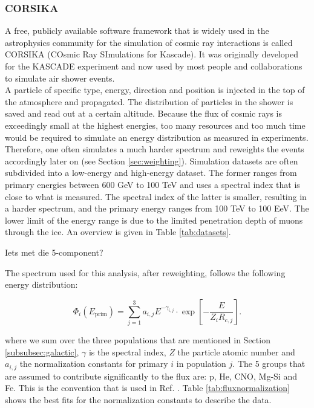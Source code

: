 \subsubsection{CORSIKA}
A free, publicly available software framework that is widely used in the astrophysics community for the simulation of cosmic ray interactions is called CORSIKA (COsmic Ray SImulations for Kascade). It was originally developed for the KASCADE experiment and now used by most people and collaborations to simulate air shower events.\\

\noindent A particle of specific type, energy, direction and position is injected in the top of the atmosphere and propagated. The distribution of particles in the shower is saved and read out at a certain altitude. Because the flux of cosmic rays is exceedingly small at the highest energies, too many resources and too much time would be required to simulate an energy distribution as measured in experiments. Therefore, one often simulates a much harder spectrum and reweights the events accordingly later on (see Section \ref{sec:weighting}). Simulation datasets are often subdivided into a low-energy and high-energy dataset. The former ranges from primary energies between 600 GeV to 100 TeV and uses a spectral index that is close to what is measured. The spectral index of the latter is smaller, resulting in a harder spectrum, and the primary energy ranges from 100 TeV to 100 EeV. The lower limit of the energy range is due to the limited penetration depth of muons through the ice. An overview is given in Table \ref{tab:datasets}.

Iets met die 5-component?

The spectrum used for this analysis, after reweighting, follows the following energy distribution:

\begin{equation}
\label{eq:gaisser}
\Phi_i \left(E_{\textrm{prim}}\right) = \sum^3_{j=1} a_{i,j} E^{-\gamma_{i,j}} \cdot \exp \left[- \frac{E}{Z_i R_{c,j}}\right].
\end{equation}

\noindent where we sum over the three populations that are mentioned in Section \ref{subsubsec:galactic}, $\gamma$ is the spectral index, $Z$ the particle atomic number and $a_{i,j}$ the normalization constants for primary $i$ in population $j$. The 5 groups that are assumed to contribute significantly to the flux are: p, He, CNO, Mg-Si and Fe. This is the convention that is used in Ref. \cite{Gaisser:2013bla}. Table \ref{tab:fluxnormalization} shows the best fits for the normalization constants to describe the data.

